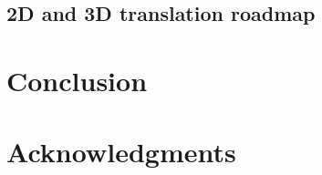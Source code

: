 \documentclass[11pt,a4paper,onecolumn]{article}
\theoremstyle{plain}
\theoremstyle{definition}
\theoremstyle{remark}
\begin{document}
\subsection{2D and 3D translation roadmap}

\section{Conclusion}\label{sec:conclusion}


\section*{Acknowledgments}


\end{document}
